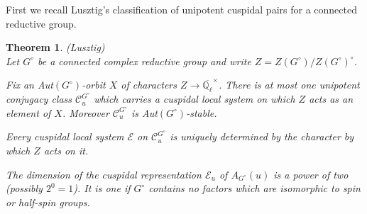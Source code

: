 \documentclass[11pt]{amsart}
\newtheorem{thm}{Theorem}[section]
\theoremstyle{definition}
\newcommand{\enuma}[1]{\begin{enumerate}[\textup{(}a\textup{)}] {#1} \end{enumerate}}
\newcommand{\Q}{\mathbb Q}
\def\cC{{\mathcal C}}
\def\cE{{\mathcal E}}
\begin{document}
First we recall Lusztig's classification of unipotent cuspidal pairs 
for a connected reductive group.

\begin{thm}\label{thm:4.1} (Lusztig) \\
Let $G^\circ$ be a connected complex reductive group and write 
$Z = Z(G^\circ) / Z(G^\circ)^\circ$. 
\enuma{
\item Fix an Aut$(G^\circ)$-orbit $X$ of characters $Z \to \overline{\Q_\ell}^\times$.
There is at most one unipotent conjugacy class $\cC_u^{G^\circ}$ which carries a 
cuspidal local system on which $Z$ acts as an element of $X$. Moreover
$\cC_u^{G^\circ}$ is Aut$(G^\circ)$-stable.
\item Every cuspidal local system $\cE$ on $\cC_u^{G^\circ}$ is uniquely determined
by the character by which $Z$ acts on it.
\item The dimension of the cuspidal representation $\cE_u$ of $A_{G^\circ} (u)$
is a power of two (possibly $2^0 = 1$). It is one if $G^\circ$ contains no factors 
which are isomorphic to spin or half-spin groups. 
} 
\end{thm}
\end{document}
